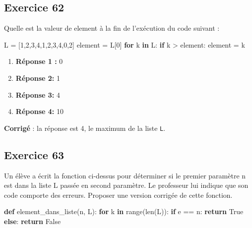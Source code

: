 \documentclass[11pt]{article}
\providecommand{\tightlist}{%
      \setlength{\itemsep}{0pt}\setlength{\parskip}{0pt}}
\newenvironment{Shaded}{}{}
\newcommand{\KeywordTok}[1]{\textcolor[rgb]{0.00,0.44,0.13}{\textbf{{#1}}}}
\newcommand{\DecValTok}[1]{\textcolor[rgb]{0.25,0.63,0.44}{{#1}}}
\newcommand{\NormalTok}[1]{{#1}}
\newcommand{\VariableTok}[1]{\textcolor[rgb]{0.10,0.09,0.49}{{#1}}}
\newcommand{\ControlFlowTok}[1]{\textcolor[rgb]{0.00,0.44,0.13}{\textbf{{#1}}}}
\newcommand{\OperatorTok}[1]{\textcolor[rgb]{0.40,0.40,0.40}{{#1}}}
\newcommand{\BuiltInTok}[1]{{#1}}
\begin{document}
    \hypertarget{exercice-62}{%
\subsection{Exercice 62}\label{exercice-62}}

Quelle est la valeur de element à la fin de l'exécution du code suivant
:

\begin{Shaded}
\begin{Highlighting}[]
\NormalTok{L }\OperatorTok{=}\NormalTok{ [}\DecValTok{1}\NormalTok{,}\DecValTok{2}\NormalTok{,}\DecValTok{3}\NormalTok{,}\DecValTok{4}\NormalTok{,}\DecValTok{1}\NormalTok{,}\DecValTok{2}\NormalTok{,}\DecValTok{3}\NormalTok{,}\DecValTok{4}\NormalTok{,}\DecValTok{0}\NormalTok{,}\DecValTok{2}\NormalTok{]}
\NormalTok{element }\OperatorTok{=}\NormalTok{ L[}\DecValTok{0}\NormalTok{]}
\ControlFlowTok{for}\NormalTok{ k }\KeywordTok{in}\NormalTok{ L:}
    \ControlFlowTok{if}\NormalTok{ k }\OperatorTok{>}\NormalTok{ element:}
\NormalTok{        element }\OperatorTok{=}\NormalTok{ k}
\end{Highlighting}
\end{Shaded}

\begin{enumerate}
\def\labelenumi{\arabic{enumi}.}
\tightlist
\item
  \textbf{Réponse 1 :} 0
\item
  \textbf{Réponse 2:} 1
\item
  \textbf{Réponse 3:} 4
\item
  \textbf{Réponse 4:} 10
\end{enumerate}

    \textbf{Corrigé} : la réponse est 4, le maximum de la liste \texttt{L}.

    \hypertarget{exercice-63}{%
\subsection{Exercice 63}\label{exercice-63}}

Un élève a écrit la fonction ci-dessus pour déterminer si le premier
paramètre n est dans la liste L passée en second paramètre. Le
professeur lui indique que son code comporte des erreurs. Proposer une
version corrigée de cette fonction.

\begin{Shaded}
\begin{Highlighting}[]
\KeywordTok{def}\NormalTok{ element\_dans\_liste(n, L):}
    \ControlFlowTok{for}\NormalTok{ k }\KeywordTok{in} \BuiltInTok{range}\NormalTok{(}\BuiltInTok{len}\NormalTok{(L)):}
        \ControlFlowTok{if}\NormalTok{ e }\OperatorTok{==}\NormalTok{ n:}
            \ControlFlowTok{return} \VariableTok{True}
        \ControlFlowTok{else}\NormalTok{:}
            \ControlFlowTok{return} \VariableTok{False}
\end{Highlighting}
\end{Shaded}
\end{document}
